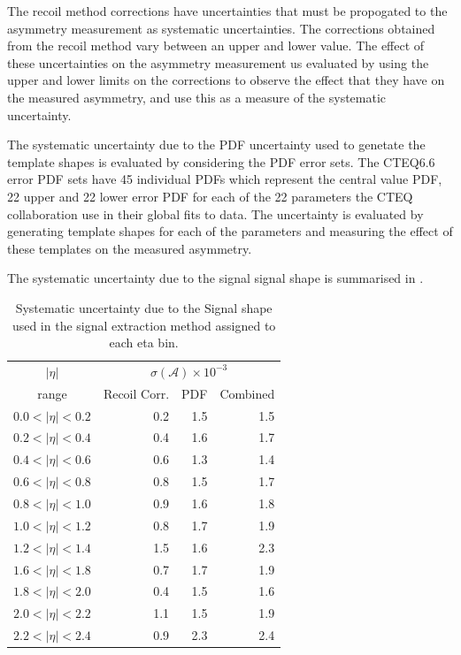 The recoil method corrections have uncertainties that must be propogated to the
asymmetry measurement as systematic uncertainties.
 The corrections obtained from the recoil method vary between an
upper and lower value\cite{}. The effect of these uncertainties on the asymmetry
measurement us evaluated by using the upper and lower limits on the corrections
to observe the effect that they have on the measured asymmetry, and use this as
a measure of the systematic uncertainty.

The systematic uncertainty due to the \ac{PDF} uncertainty used to genetate the
template shapes is evaluated by considering the \ac{PDF} error sets. The CTEQ6.6
error \ac{PDF} sets have 45 individual \acp{PDF}
which represent the central value \ac{PDF}, 22 upper and 22 lower error \ac{PDF}
for each of the 22 parameters the CTEQ collaboration use in their global fits to
data.
The uncertainty is evaluated by generating template shapes for each of the
parameters and measuring the effect of these templates on the measured
asymmetry. 

The systematic uncertainty due to the signal \ETm signal shape is summarised in
.

\begin{table}[htbp]
\begin{center}
\begin{tabular}{crrr}
\toprule
$|\eta|$  & \multicolumn{3}{c}{$\sigma(\mathcal{A}) \times 10^{-3}$}\\
range     & Recoil Corr.& PDF & Combined \\
\midrule
$0.0<|\eta|<0.2$ &  0.2 &  1.5  & 1.5 \\
$0.2<|\eta|<0.4$ &  0.4 &  1.6  & 1.7 \\
$0.4<|\eta|<0.6$ &  0.6 &  1.3  & 1.4 \\
$0.6<|\eta|<0.8$ &  0.8 &  1.5  & 1.7 \\
$0.8<|\eta|<1.0$ &  0.9 &  1.6  & 1.8 \\
$1.0<|\eta|<1.2$ &  0.8 &  1.7  & 1.9 \\
$1.2<|\eta|<1.4$ &  1.5 &  1.6  & 2.3 \\
$1.6<|\eta|<1.8$ &  0.7 &  1.7  & 1.9 \\
$1.8<|\eta|<2.0$ &  0.4 &  1.5  & 1.6 \\
$2.0<|\eta|<2.2$ &  1.1 &  1.5  & 1.9 \\
$2.2<|\eta|<2.4$ &  0.9 &  2.3  & 2.4 \\
\bottomrule
\end{tabular}
\caption{\label{tab:updatedsystsig} Systematic uncertainty due to the Signal \MET shape
used in the signal extraction method assigned to each eta bin.}
\end{center}
\end{table}

